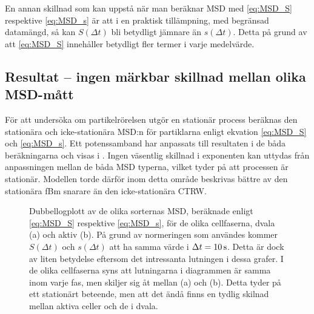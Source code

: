 En annan skillnad som kan uppstå när man beräknar MSD med \eqref{eq:MSD_S} respektive \eqref{eq:MSD_s} är att i en praktisk tillämpning, med begränsad datamängd, så kan $S(\Delta{t})$ bli betydligt jämnare än $s(\Delta{t})$. Detta på grund av att \eqref{eq:MSD_S} innehåller betydligt fler termer i varje medelvärde. 


\subsection{Resultat -- ingen märkbar skillnad mellan olika MSD-mått}

För att undersöka om partikelrörelsen utgör en stationär process beräknas den stationära och icke-stationära MSD:n för partiklarna enligt ekvation \eqref{eq:MSD_S} och \eqref{eq:MSD_s}. Ett potenssamband har anpassats till resultaten i de båda beräkningarna och visas i . 
Ingen väsentlig skillnad i exponenten kan uttydas från anpassningen mellan de båda MSD typerna, vilket tyder på att processen är stationär. Modellen torde därför inom detta område beskrivas bättre av den stationära fBm snarare än den icke-stationära CTRW.

\begin{figure}\centerline{
\subfigure[][]{

}
\subfigure[][]{

}
}
\caption{Dubbellogplott av de olika sorternas MSD, beräknade enligt \eqref{eq:MSD_S} respektive \eqref{eq:MSD_s}, för de olika cellfaserna, dvala (a) och aktiv (b). På grund av normeringen som användes kommer $S(\Delta{t})$ och $s(\Delta{t})$ att ha samma värde i $\Delta{t}=\unit[10]{s}$. Detta är dock av liten betydelse eftersom det intressanta lutningen i dessa grafer. I de olika cellfaserna syns att lutningarna i diagrammen är samma inom varje fas, men skiljer sig åt mellan (a) och (b). Detta tyder på ett stationärt beteende, men att det ändå finns en tydlig skilnad mellan aktiva celler och de i dvala. %
}
\label{fig:MSD}
\end{figure}

